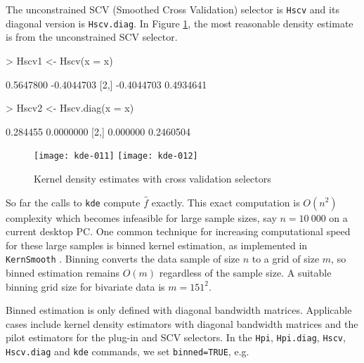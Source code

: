 \documentclass[a4paper,11pt]{article}
\let\code=\texttt
\let\pkg=\texttt
\begin{document}
The unconstrained SCV (Smoothed Cross Validation) selector is \code{Hscv} and 
its diagonal version is \code{Hscv.diag}.
In Figure \ref{fig:cv}, the most
reasonable density estimate is from the unconstrained SCV selector. 
 
\begin{Schunk}
\begin{Sinput}
> Hscv1 <- Hscv(x = x)
\end{Sinput}
\begin{Soutput}
           [,1]       [,2]
[1,]  0.5647800 -0.4044703
[2,] -0.4044703  0.4934641
\end{Soutput}
\begin{Sinput}
> Hscv2 <- Hscv.diag(x = x)
\end{Sinput}
\begin{Soutput}
         [,1]      [,2]
[1,] 0.284455 0.0000000
[2,] 0.000000 0.2460504
\end{Soutput}
\end{Schunk}

\begin{figure}[!ht]
\centering
\texttt{[image: kde-011]}
\texttt{[image: kde-012]}
\caption{Kernel density estimates with cross validation selectors}
\label{fig:cv}
\end{figure}


So far the calls to \code{kde} compute $\hat{f}$ exactly. This exact 
computation is $O(n^2)$ complexity which becomes infeasible for large
sample sizes, say $n=10\ 000$ on a current desktop PC. 
 One common technique for increasing computational
speed for these large samples is binned kernel estimation, 
as implemented in
\pkg{KernSmooth} \citep*{KernSmooth}. 
Binning converts the data sample of size $n$ to a grid of size $m$,
so binned estimation remains $O(m)$ regardless of the sample size.
A suitable binning grid size for bivariate data is $m = 151^2$.


Binned estimation is only defined 
with diagonal bandwidth matrices. Applicable cases include 
kernel density estimators with diagonal bandwidth matrices and
the pilot estimators for the plug-in and SCV selectors. 
In the \code{Hpi}, \code{Hpi.diag}, \code{Hscv}, \code{Hscv.diag}
and \code{kde} commands, we set \code{binned=TRUE}, e.g. 
\end{document}
